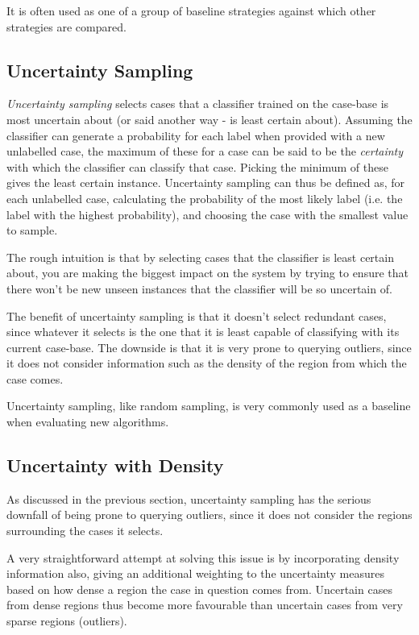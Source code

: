 \documentclass[a4paper,11pt]{report}
\begin{document}
It is often used as one of a group of baseline strategies against which other strategies are compared.

\subsection{Uncertainty Sampling}
\emph{Uncertainty sampling} \citep{Lewis1994} selects cases that a classifier trained on the case-base is most uncertain about (or said another way - is least certain about). Assuming the classifier can generate a probability for each label when provided with a new unlabelled case, the maximum of these for a case can be said to be the \emph{certainty} with which the classifier can classify that case. Picking the minimum of these gives the least certain instance. Uncertainty sampling can thus be defined as, for each unlabelled case, calculating the probability of the most likely label (i.e. the label with the highest probability), and choosing the case with the smallest value to sample.

The rough intuition is that by selecting cases that the classifier is least certain about, you are making the biggest impact on the system by trying to ensure that there won't be new unseen instances that the classifier will be so uncertain of.

The benefit of uncertainty sampling is that it doesn't select redundant cases, since whatever it selects is the one that it is least capable of classifying with its current case-base. The downside is that it is very prone to querying outliers, since it does not consider information such as the density of the region from which the case comes.

Uncertainty sampling, like random sampling, is very commonly used as a baseline when evaluating new algorithms.

\subsection{Uncertainty with Density}
As discussed in the previous section, uncertainty sampling has the serious downfall of being prone to querying outliers, since it does not consider the regions surrounding the cases it selects.

A very straightforward attempt at solving this issue is by incorporating density information also, giving an additional weighting to the uncertainty measures based on how dense a region the case in question comes from. Uncertain cases from dense regions thus become more favourable than uncertain cases from very sparse regions (outliers).
\end{document}
